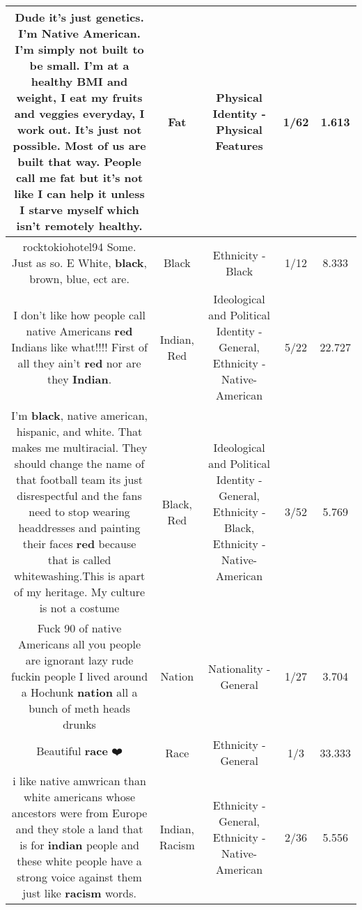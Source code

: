 \documentclass[11pt]{article}
\newlength\mylength
\begin{document}
\begin{center}
\begin{longtable}{|C{.65\mylength}|C{.30\mylength}|C{.12\mylength}|C{.12\mylength}|C{.12\mylength}|}
  \small Dude it's just genetics. I'm Native American. I'm simply not built to be small. I'm at a healthy BMI and weight, I eat my fruits and veggies everyday, I work out. It's just not possible. Most of us are built that way. People call me \textbf{fat} but it's not like I can help it unless I starve myself which isn't remotely healthy.\normalsize   & Fat & Physical Identity - Physical Features & 1/62 & 1.613 \\  \hline
  \small rocktokiohotel94 Some. Just as so. E White, \textbf{black}, brown, blue, ect are.\normalsize   & Black & Ethnicity - Black & 1/12 & 8.333 \\  \hline
  \small I don't like how people call native Americans \textbf{r\textbf{ed}} Indians like what!!!!  First of all they ain't \textbf{r\textbf{ed}} nor are they \textbf{Indian}.\normalsize   & Indian, Red &  Ideological and Political Identity - General, Ethnicity - Native-American & 5/22 & 22.727 \\  \hline
  \small I'm \textbf{black}, native american, hispanic, and white. That makes me multiracial. They should change the name of that football team its just disrespectful and the fans need to stop wearing headdresses and painting their faces \textbf{r\textbf{ed}} because that is called whitewashing.This is apart of my heritage. My culture is not a costume\normalsize   & Black, Red &  Ideological and Political Identity - General, Ethnicity - Black, Ethnicity - Native-American & 3/52 & 5.769 \\  \hline
  \small Fuck 90 of native Americans all you people are ignorant lazy rude fuckin people I lived around a Hochunk \textbf{nation} all a bunch of meth heads drunks\normalsize   & Nation & Nationality - General & 1/27 & 3.704 \\  \hline
  \small Beautiful \textbf{race} ❤️\normalsize   & Race & Ethnicity - General & 1/3 & 33.333 \\  \hline
  \small i like native amwrican than white americans whose ancestors were from Europe and they stole a land that is for \textbf{indian} people and these white people have a strong voice against them just like \textbf{racism} words.\normalsize   & Indian, Racism & Ethnicity - General, Ethnicity - Native-American & 2/36 & 5.556 \\  \hline

\end{longtable}
\end{center}
\end{document}
